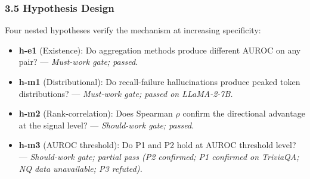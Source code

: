 \subsubsection{3.5 Hypothesis Design}

Four nested hypotheses verify the mechanism at increasing specificity:
\begin{itemize}
\item \textbf{h-e1} (Existence): Do aggregation methods produce different AUROC on any pair? --- \textit{Must-work gate; passed.}
\item \textbf{h-m1} (Distributional): Do recall-failure hallucinations produce peaked token distributions? --- \textit{Must-work gate; passed on LLaMA-2-7B.}
\item \textbf{h-m2} (Rank-correlation): Does Spearman $\rho$ confirm the directional advantage at the signal level? --- \textit{Should-work gate; passed.}
\item \textbf{h-m3} (AUROC threshold): Do P1 and P2 hold at AUROC threshold level? --- \textit{Should-work gate; partial pass (P2 confirmed; P1 confirmed on TriviaQA; NQ data unavailable; P3 refuted).}
\end{itemize}

